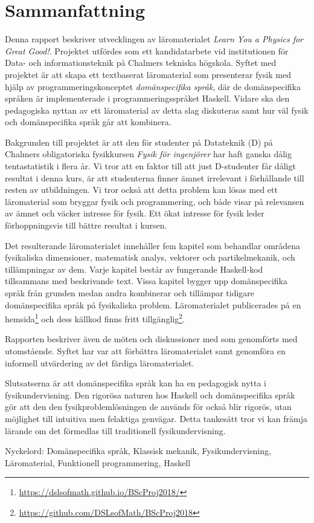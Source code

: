 
\thispagestyle{plain}			%

\section*{Sammanfattning}

Denna rapport beskriver utvecklingen av läromaterialet \textit{Learn You a
Physics for Great Good!}. Projektet utfördes som ett kandidatarbete vid institutionen
för Data- och informationsteknik på Chalmers tekniska högskola. Syftet
med projektet är att skapa ett textbaserat läromaterial som presenterar fysik med hjälp av programmeringskonceptet
\textit{domänspecifika språk}, där de domänspecifika språken är
implementerade i programmeringsspråket Haskell. Vidare ska 
den pedagogiska nyttan av ett läromaterial av detta slag diskuteras samt hur väl fysik och
domänspecifika språk går att kombinera.

Bakgrunden till projektet är att den för studenter på Datateknik (D) på
Chalmers obligatoriska fysikkursen \textit{Fysik för ingenjörer} har
haft ganska dålig tentastatistik i flera år. Vi tror att en
faktor till att just D-studenter får dåligt resultat i denna
kurs, är att studenterna finner ämnet irrelevant i förhållande till
resten av utbildningen. Vi tror också att detta problem kan lösas med ett
läromaterial som bryggar fysik och
programmering, och både visar på relevansen av ämnet och väcker
intresse för fysik. Ett ökat intresse för fysik leder förhoppningsvis
till bättre resultat i kursen.

Det resulterande läromaterialet innehåller fem kapitel som
behandlar områdena fysikaliska dimensioner, matematisk analys,
vektorer och partikelmekanik, och tillämpningar av dem. Varje kapitel
består av fungerande Haskell-kod tillsammans med beskrivande
text. Vissa kapitel bygger upp domänspecifika språk från grunden medan
andra kombinerar och tillämpar tidigare domänspecifika språk på
fysikaliska problem. Läromaterialet publicerades på en hemsida\footnote{\url{https://dslsofmath.github.io/BScProj2018/}}
och dess källkod finns
fritt tillgänglig\footnote{\url{https://github.com/DSLsofMath/BScProj2018}}.

Rapporten beskriver
även de möten och diskussioner med som genomförts med utomstående. Syftet har var att
förbättra läromaterialet samt genomföra en informell utvärdering av det
färdiga läromaterialet.

Slutsatserna är att
domänspecifika språk kan ha en pedagogisk nytta i
fysikundervisning. Den 
rigorösa naturen hos Haskell och domänspecifika språk gör att den
den fysikproblemlösningen de används för också blir
rigorös, utan möjlighet till intuitiva men felaktiga
genvägar. Detta tankesätt tror vi kan främja lärande om det förmedlas
till traditionell fysikundervisning.

\vfill
Nyckelord: Domänspecifika språk, Klassisk mekanik, Fysikundervisning, Läromaterial, Funktionell programmering, Haskell

\newpage				%
\thispagestyle{empty}
\mbox{}
